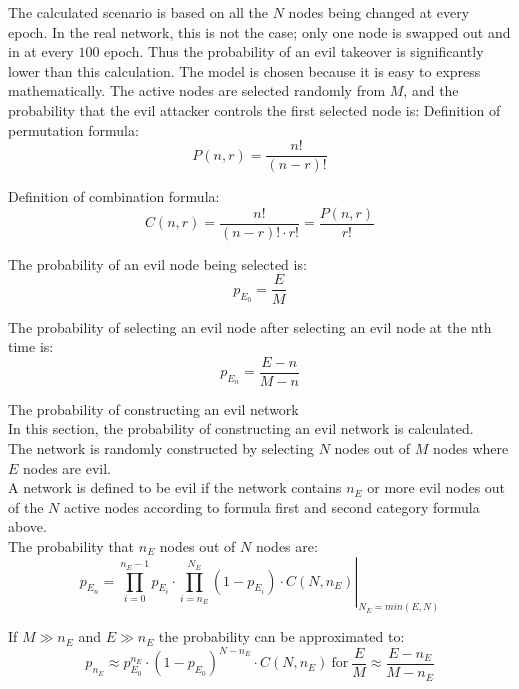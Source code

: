 The calculated scenario is based on all the $N$ nodes being changed at every epoch. In the real network, this is not the case; only one node is swapped out and in at every $100$ epoch. Thus the probability of an evil takeover is significantly lower than this calculation. The model is chosen because it is easy to express mathematically. 
The active nodes are selected randomly from $M$, and the probability that the evil attacker controls the first selected node is:
Definition of permutation formula:
\begin{equation}
 P(n,r) = \frac{n!}{(n-r)!}
\end{equation}

Definition of combination formula:
\begin{equation}
 C(n,r) = \frac{n!}{(n-r)! \cdot r!} = \frac{P(n,r)}{r!}
\end{equation}


The probability of an evil node being selected is:
\begin{equation}
 p_{E_0} = \frac{E}{M}
\end{equation}

The probability of selecting an evil node after selecting an evil node at the nth time is:
\begin{equation}
 p_{E_n} = \frac{E-n}{M-n}
\end{equation}


The probability of constructing an evil network\\
In this section, the probability of constructing an evil network is calculated.\\
The network is randomly constructed by selecting $N$ nodes out of $M$ nodes where $E$ nodes are evil.\\
A network is defined to be evil if the network contains $n_E$ or more evil nodes out of the $N$ active nodes according to formula first and second category formula above.\\

The probability that $n_E$ nodes out of $N$ nodes are:
\begin{equation}
 p_{E_n} = \left. \prod_{i=0}^{n_E-1}{p_{E_i}} \cdot \prod_{i=n_E}^{N_E}{(1-p_{E_i}) \cdot C(N,n_E)} \right| _{N_E = min(E,N)}
\end{equation}


If $M \gg n_E$  and $E \gg n_E$  the probability can be approximated to:
\begin{equation}
 p_{n_E} \approx p_{E_0}^{n_E} \cdot (1-p_{E_0})^{N-n_E} \cdot C(N,n_E) ~ \text{for} ~ \frac{E}{M} \approx \frac{E-n_E}{M-n_E}
\end{equation}

